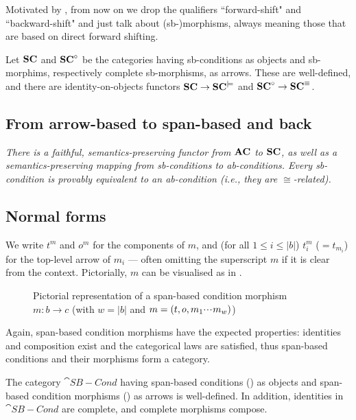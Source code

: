 %
Motivated by , from now on we drop the qualifiers ``forward-shift" and ``backward-shift" and just talk about (sb-)morphisms, always meaning those that are based on direct forward shifting.

\begin{theorem} 
Let $\mathbf{SC}$ and $\mathbf{SC}^\circ$ be the categories having sb-conditions as objects and sb-morphims, respectively complete sb-morphisms, as arrows. These are well-defined, and there are identity-on-objects functors $\mathbf{SC} \to \mathbf{SC}^{\models}$ and $\mathbf{SC}^\circ \to \mathbf{SC}^{\equiv}$.
\end{theorem}

\subsection{From arrow-based to span-based and back}

\emph{There is a faithful, semantics-preserving functor from $\mathbf{AC}$ to $\mathbf{SC}$, as well as a semantics-preserving mapping from sb-conditions to ab-conditions. Every sb-condition is provably equivalent to an ab-condition (i.e., they are $\cong$-related).}

\subsection{Normal forms}


%
\begin{center}

\end{center}
%
We write $t^m$ and $o^m$ for the components of $m$, and (for all $1\leq i\leq |b|$) $t^m_i$ ($=t_{m_i}$) for the top-level arrow of $m_i$ --- often omitting the superscript $m$ if it is clear from the context. Pictorially, $m$ can be visualised as in .
%
\begin{figure}
  \centering
  
  \caption{Pictorial representation of a span-based condition morphism $m:b\to c$ (with $w=|b|$ and $m=(t,o,m_1{\cdotp\mkern-2mu\cdotp\mkern-2mu\cdotp\mkern1mu} m_w)$)}
\end{figure}

\medskip\noindent Again, span-based condition morphisms have the expected properties: identities and composition exist and the categorical laws are satisfied, thus span-based conditions and their morphisms form a category.

\begin{proposition}
  The category $\cat{SB-Cond}$ having span-based conditions () as objects and span-based condition morphisms () as arrows is well-defined. In addition, identities in $\cat{SB-Cond}$ are complete, and complete morphisms compose.
\end{proposition}
 
